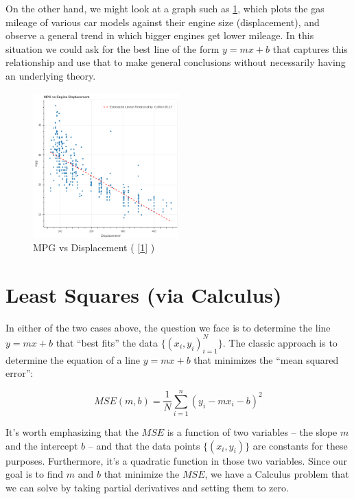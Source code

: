 \documentclass[
  oneside]{scrbook}
\begin{document}
On the other hand, we might look at a graph such as
\ref{fig:mpg-vs-displacement}, which plots the gas mileage of various
car models against their engine size (displacement), and observe a
general trend in which bigger engines get lower mileage. In this
situation we could ask for the best line of the form \(y=mx+b\) that
captures this relationship and use that to make general conclusions
without necessarily having an underlying theory.

\begin{figure}
\hypertarget{fig:mpg-vs-displacement}{%
\centering
\includegraphics[width=0.5\textwidth,height=\textheight]{img/mpg-vs-displacement.png}
\caption{MPG vs Displacement ( {[}\protect\hyperlink{ref-irvine}{1}{]}
)}\label{fig:mpg-vs-displacement}
}
\end{figure}

\hypertarget{sec:Calculus}{%
\section{Least Squares (via Calculus)}\label{sec:Calculus}}

In either of the two cases above, the question we face is to determine
the line \(y=mx+b\) that ``best fits'' the data
\(\{(x_i,y_i)_{i=1}^{N}\}\). The classic approach is to determine the
equation of a line \(y=mx+b\) that minimizes the ``mean squared error'':

\[ MSE(m,b) = \frac{1}{N}\sum_{i=1}^{n} (y_i-mx_i-b)^2 \]

It's worth emphasizing that the \(MSE\) is a function of two variables
-- the slope \(m\) and the intercept \(b\) -- and that the data points
\(\{(x_i,y_i)\}\) are constants for these purposes. Furthermore, it's a
quadratic function in those two variables. Since our goal is to find
\(m\) and \(b\) that minimize the \(MSE\), we have a Calculus problem
that we can solve by taking partial derivatives and setting them to
zero.
\end{document}
